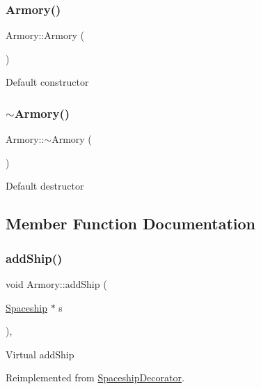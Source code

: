 \subsubsection{\texorpdfstring{Armory()}{Armory()}}
{\footnotesize\ttfamily Armory\+::\+Armory (\begin{DoxyParamCaption}{ }\end{DoxyParamCaption})}

Default constructor \mbox{\label{classArmory_a4af8efb475734ef6292e5cdef489c9d9}} 
\subsubsection{\texorpdfstring{$\sim$\+Armory()}{~Armory()}}
{\footnotesize\ttfamily Armory\+::$\sim$\+Armory (\begin{DoxyParamCaption}{ }\end{DoxyParamCaption})}

Default destructor 

\subsection{Member Function Documentation}
\mbox{\label{classArmory_adccb51a0901294546bfb1da350ae6836}} 
\subsubsection{\texorpdfstring{add\+Ship()}{addShip()}}
{\footnotesize\ttfamily void Armory\+::add\+Ship (\begin{DoxyParamCaption}\item[{\hyperlink{classSpaceship}{Spaceship} $\ast$}]{s }\end{DoxyParamCaption})\hspace{0.3cm}{\ttfamily [inline]}, {\ttfamily [virtual]}}

Virtual add\+Ship 

Reimplemented from \hyperlink{classSpaceshipDecorator_a5ed39419f5fab65dd4af11bf5136f7a4}{Spaceship\+Decorator}.

\mbox{\label{classArmory_aba8aa540182986fbb0ca8a741f491ffe}} 
